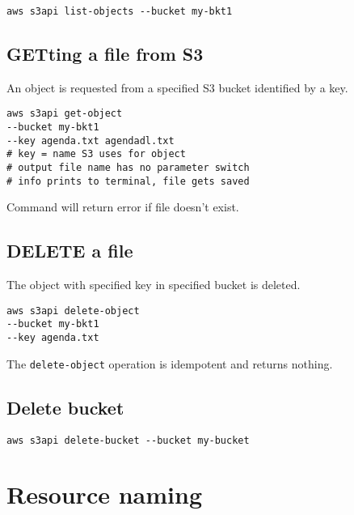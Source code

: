 \documentclass{pgnotes}
\begin{document}
\begin{verbatim}
aws s3api list-objects --bucket my-bkt1
\end{verbatim}

\subsection{GETting a file from S3}

An object is requested from a specified S3 bucket identified by a key. 
\begin{verbatim}
aws s3api get-object 
--bucket my-bkt1 
--key agenda.txt agendadl.txt
# key = name S3 uses for object
# output file name has no parameter switch
# info prints to terminal, file gets saved
\end{verbatim}
Command will return error if file doesn't exist. 


\subsection{DELETE a file}

The object with specified key in specified bucket is deleted.
\begin{verbatim}
aws s3api delete-object 
--bucket my-bkt1 
--key agenda.txt
\end{verbatim}
The \texttt{delete-object} operation is idempotent and returns nothing.


\subsection{Delete bucket}

\begin{verbatim}
aws s3api delete-bucket --bucket my-bucket
\end{verbatim}

\section{Resource naming}
\end{document}
